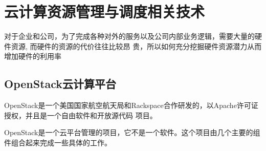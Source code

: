 
\chapter{云计算资源管理与调度相关技术}
\label{chap:outline}

对于企业和公司，为了完成各种对外的服务以及公司内部业务逻辑，需要大量的硬件资源, 而硬件的资源的代价往往比较昂
贵，所以如何充分挖掘硬件资源潜力从而增加硬件的利用率

\section{OpenStack云计算平台}

OpenStack是一个美国国家航空航天局和Rackspace合作研发的，以Apache许可证授权，并且是一个自由软件和开放源代码
项目。

OpenStack是一个云平台管理的项目，它不是一个软件。这个项目由几个主要的组件组合起来完成一些具体的工作。


